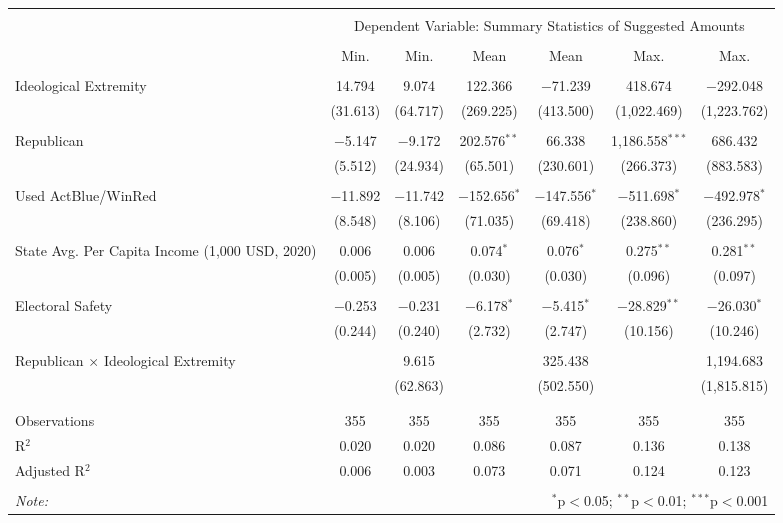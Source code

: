 
\begin{tabular}{@{\extracolsep{5pt}}lcccccc} 
\\[-1.8ex]\hline 
\hline \\[-1.8ex] 
 & \multicolumn{6}{c}{Dependent Variable: Summary Statistics of Suggested Amounts} \\ 
\cline{2-7} 
\\[-1.8ex] & Min. & Min. & Mean & Mean & Max. & Max. \\ 
\hline \\[-1.8ex] 
 Ideological Extremity & 14.794 & 9.074 & 122.366 & $-$71.239 & 418.674 & $-$292.048 \\ 
  & (31.613) & (64.717) & (269.225) & (413.500) & (1,022.469) & (1,223.762) \\ 
  & & & & & & \\ 
 Republican & $-$5.147 & $-$9.172 & 202.576$^{**}$ & 66.338 & 1,186.558$^{***}$ & 686.432 \\ 
  & (5.512) & (24.934) & (65.501) & (230.601) & (266.373) & (883.583) \\ 
  & & & & & & \\ 
 Used ActBlue/WinRed & $-$11.892 & $-$11.742 & $-$152.656$^{*}$ & $-$147.556$^{*}$ & $-$511.698$^{*}$ & $-$492.978$^{*}$ \\ 
  & (8.548) & (8.106) & (71.035) & (69.418) & (238.860) & (236.295) \\ 
  & & & & & & \\ 
 State Avg. Per Capita Income (1,000 USD, 2020) & 0.006 & 0.006 & 0.074$^{*}$ & 0.076$^{*}$ & 0.275$^{**}$ & 0.281$^{**}$ \\ 
  & (0.005) & (0.005) & (0.030) & (0.030) & (0.096) & (0.097) \\ 
  & & & & & & \\ 
 Electoral Safety & $-$0.253 & $-$0.231 & $-$6.178$^{*}$ & $-$5.415$^{*}$ & $-$28.829$^{**}$ & $-$26.030$^{*}$ \\ 
  & (0.244) & (0.240) & (2.732) & (2.747) & (10.156) & (10.246) \\ 
  & & & & & & \\ 
 Republican $\times$ Ideological Extremity &  & 9.615 &  & 325.438 &  & 1,194.683 \\ 
  &  & (62.863) &  & (502.550) &  & (1,815.815) \\ 
  & & & & & & \\ 
\hline \\[-1.8ex] 
Observations & 355 & 355 & 355 & 355 & 355 & 355 \\ 
R$^{2}$ & 0.020 & 0.020 & 0.086 & 0.087 & 0.136 & 0.138 \\ 
Adjusted R$^{2}$ & 0.006 & 0.003 & 0.073 & 0.071 & 0.124 & 0.123 \\ 
\hline 
\hline \\[-1.8ex] 
\textit{Note:}  & \multicolumn{6}{r}{$^{*}$p$<$0.05; $^{**}$p$<$0.01; $^{***}$p$<$0.001} \\ 
\end{tabular} 
